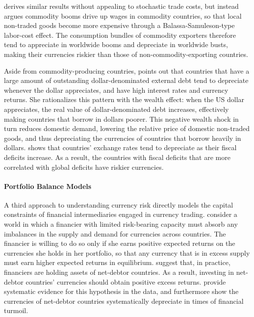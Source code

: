 \documentclass[11pt]{article}
\begin{document}
\citet{Powers2015} derives similar results without appealing to stochastic trade costs, but instead argues commodity booms drive up wages in commodity countries, so that local non-traded goods become more expensive through a Balassa-Samuleson-type labor-cost effect. The consumption bundles of commodity exporters therefore tend to appreciate in worldwide booms and depreciate in worldwide busts, making their currencies riskier than those of non-commodity-exporting countries.

Aside from commodity-producing countries, \citet{Wiriadinata2020} points out that countries that have a large amount of outstanding dollar-denominated external debt tend to depreciate whenever the dollar appreciates, and have high interest rates and currency returns. She rationalizes this pattern with the wealth effect: when the US dollar appreciates, the real value of dollar-denominated debt increases, effectively making countries that borrow in dollars poorer. This negative wealth shock in turn reduces domestic demand, lowering the relative price of domestic non-traded goods, and thus depreciating the currencies of countries that borrow heavily in dollars. \citet{Jiang2020} shows that countries' exchange rates tend to depreciate as their fiscal deficits increase. As a result, the countries with fiscal deficits that are more correlated with global deficits have riskier currencies.

\paragraph*{Portfolio Balance Models} A third approach to understanding currency risk directly models the capital constraints of financial intermediaries engaged in currency trading. \citet{GabaixMaggiori2015} consider a world in which a financier with limited risk-bearing capacity must absorb any imbalances in the supply and demand for currencies across countries. The financier is willing to do so only if she earns positive expected returns on the currencies she holds in her portfolio, so that any currency that is in excess supply must earn higher expected returns in equilibrium.  \citet{GabaixMaggiori2015} suggest that, in practice, financiers are holding assets of net-debtor countries. As a result, investing in net-debtor countries' currencies should obtain positive excess returns. \citet{DellaCorteetal2016} provide systematic evidence for this hypothesis in the data, and furthermore show the currencies of net-debtor countries systematically depreciate in times of financial turmoil.
\end{document}
